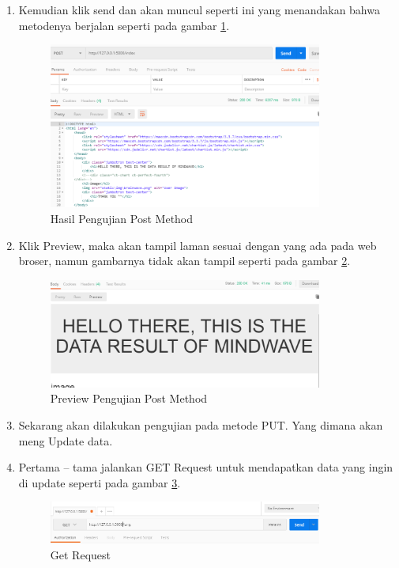 \begin{enumerate}
\item Kemudian klik send dan akan muncul seperti ini yang menandakan bahwa metodenya berjalan seperti pada gambar \ref{fig:hppm}.
\begin{figure}[!htbp]
	\centerline{\includegraphics[width=0.85\textwidth]{figures/11/hppm.PNG}}
	\caption{Hasil Pengujian Post Method}
	\label{fig:hppm}
\end{figure}

\item Klik Preview, maka akan tampil laman sesuai dengan yang ada pada web broser, namun gambarnya tidak akan tampil seperti pada gambar \ref{fig:pppm}.
\begin{figure}[!htbp]
	\centerline{\includegraphics[width=0.85\textwidth]{figures/11/pppm.PNG}}
	\caption{Preview Pengujian Post Method}
	\label{fig:pppm}
\end{figure}

\item Sekarang akan dilakukan pengujian pada metode PUT. Yang dimana akan meng Update data.
\item Pertama – tama jalankan GET Request untuk mendapatkan data yang ingin di update seperti pada gambar \ref{fig:gr}.
\begin{figure}[!htbp]
	\centerline{\includegraphics[width=0.85\textwidth]{figures/11/gr.PNG}}
	\caption{Get Request}
	\label{fig:gr}
\end{figure}


\end{enumerate}

